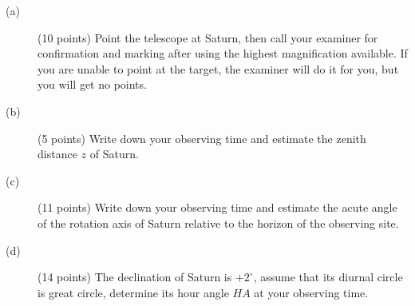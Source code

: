 \begin{description}
\item[(a)] (10 points) Point the telescope at Saturn, then call your examiner
  for confirmation and marking after using the highest magnification
  available. If you are unable to point at the target, the examiner will do it
  for you, but you will get no points.
\item[(b)] (5 points) Write down your observing time and estimate the zenith
  distance $z$ of Saturn.
\item[(c)] (11 points) Write down your observing time and estimate the acute
  angle of the rotation axis of Saturn relative to the horizon of the
  observing site.
\item[(d)] (14 points) The declination of Saturn is $+2^\circ$, assume that
  its diurnal circle is great circle, determine its hour angle $HA$ at your
  observing time.
\end{description}
